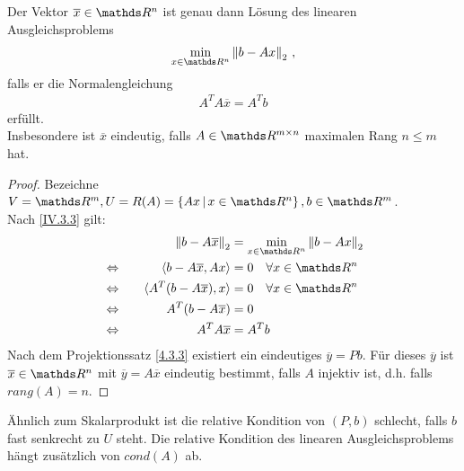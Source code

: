 \begin{Satze}
  Der Vektor $\overline{x} \in\R^n$ ist genau dann Lösung des linearen Ausgleichsproblems
  \begin{gather*}
    \min_{x\in\Ren} \nn{b-Ax}_2 \, ,
  \end{gather*}
  falls er die Normalengleichung
  \begin{gather}
    A^TA\overline{x} = A^Tb
    \label{IV.3.6}
  \end{gather}
  erfüllt. \\
  Insbesondere ist $\overline{x}$ eindeutig,
  falls $A\in \R^{m\times n}$ maximalen Rang $n\leq m$ hat.
\end{Satze}

\begin{proof} Bezeichne
  $V= \R^m, U= R(A) = \left\{Ax \, \middle|  \, x \in\Ren \right\}, b \in \R^m$.\\
  Nach \eqref{IV.3.3} gilt:
  \begin{alignat*}{2}
    &&\nn{b-A\overline{x}}_2 &= \min_{x\in\Ren} \nn{b-Ax}_2 \\
    &\Leftrightarrow \quad & \scp{b-A \overline{x}}{Ax} &= 0 \quad \forall x\in \Ren \\
    &\Leftrightarrow & \scp{A^T(b-A\overline{x})}{x} &= 0 \quad  \forall x\in\Ren \\
    &\Leftrightarrow & A^T(b-A\overline{x}) &= 0 \\
    &\Leftrightarrow & A^TA\overline{x} &= A^Tb
  \end{alignat*}
  Nach dem Projektionssatz \ref{4.3.3} existiert ein eindeutiges
  $\overline{y} = P b$.
  Für dieses $\overline{y}$ ist $\overline{x}\in \Ren $ mit $\overline{y} = A\overline{x}$
  eindeutig bestimmt, falls $A$ injektiv ist, d.h. falls $rang(A) = n$. 
\end{proof}

Ähnlich zum Skalarprodukt ist die relative Kondition von $(P,b) $ schlecht, 
falls $b$ fast senkrecht zu $U$ steht.
Die relative Kondition des linearen Ausgleichsproblems hängt zusätzlich von $cond(A)$ ab.


